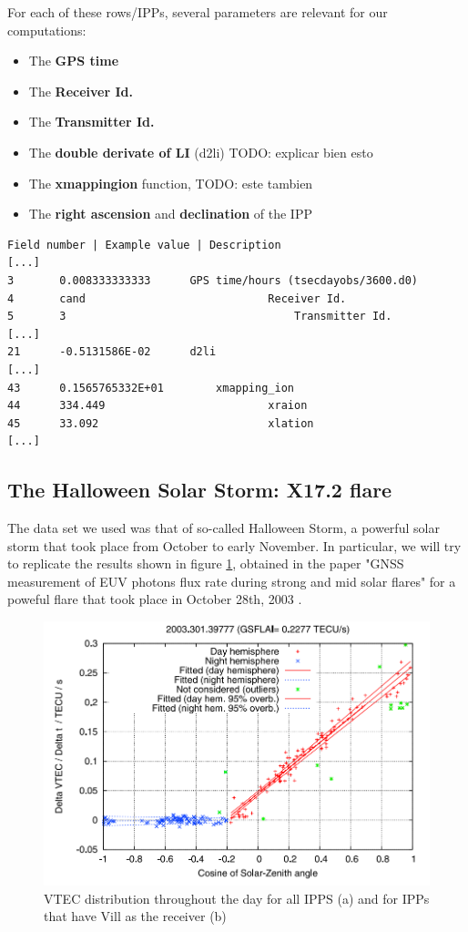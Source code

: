 For each of these rows/IPPs, several parameters are relevant for our computations:


\begin{itemize}
\item The \textbf{GPS time}
\item The \textbf{Receiver Id.}
\item The \textbf{Transmitter Id.}
\item The \textbf{double derivate of LI} (d2li) TODO: explicar bien esto
\item The \textbf{xmappingion} function, TODO: este tambien
\item The \textbf{right ascension} and \textbf{declination} of the IPP
\end{itemize}

\begin{lstlisting}[caption=Format of the ti file]
Field number | Example value | Description
[...]
3 		0.008333333333		GPS time/hours (tsecdayobs/3600.d0)
4 		cand							Receiver Id.
5 		3									Transmitter Id.
[...]
21 		-0.5131586E-02		d2li
[...]
43 		0.1565765332E+01		xmapping_ion
44 		334.449							xraion
45 		33.092							xlation
[...]
\end{lstlisting}

\subsection{The Halloween Solar Storm: X17.2 flare}

The data set we used was that of so-called Halloween Storm, a powerful solar storm that took place from October to early November. In particular, we will try to replicate the results shown in figure \ref{fig:halloweenPaper}, obtained in the paper "GNSS measurement of EUV photons flux rate during strong and mid solar flares" for a poweful flare that took place in October 28th, 2003 \cite{hernandez2012gnss}.

\begin{figure}[!htb]
	\begin{centering}
		\includegraphics[width=0.5\linewidth]{images/ch4/halloweenPaper.png}
		\caption{VTEC distribution throughout the day for all IPPS (a) and for IPPs that have Vill as the receiver (b)}
		\label{fig:halloweenPaper}
	\end{centering}
\end{figure}

